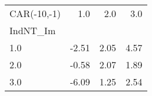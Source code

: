 \begin{tabular}{lrrr}
\toprule
CAR(-10,-1) &   1.0 &   2.0 &   3.0 \\
IndNT\_Im &       &       &       \\
\midrule
1.0      & -2.51 &  2.05 &  4.57 \\
2.0      & -0.58 &  2.07 &  1.89 \\
3.0      & -6.09 &  1.25 &  2.54 \\
\bottomrule
\end{tabular}
